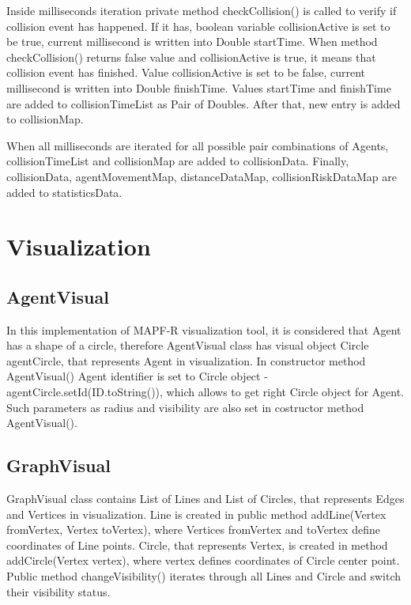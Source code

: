 \documentclass[thesis=B,english]{FITthesis}[2019/12/23]
\begin{document}
Inside milliseconds iteration private method checkCollision() is called to verify if collision event has happened. If it has, boolean variable collisionActive is set to be true, current millisecond is written into Double startTime. When method checkCollision() returns false value and collisionActive is true, it means that collision event has finished. Value collisionActive is set to be false, current millisecond is written into Double finishTime. Values startTime and finishTime are added to collisionTimeList as Pair of Doubles. After that, new entry is added to collisionMap. 

When all milliseconds are iterated for all possible pair combinations of Agents, 
collisionTimeList and collisionMap are added to collisionData. Finally,
collisionData, agentMovementMap, distanceDataMap, collisionRiskDataMap are added to statisticsData.

\section{Visualization}

\subsection{AgentVisual}

In this implementation of MAPF-R visualization tool, it is considered that Agent has a shape of a circle, therefore AgentVisual class has visual object Circle agentCircle, that represents Agent in visualization. In constructor method AgentVisual() Agent identifier is set to Circle object - agentCircle.setId(ID.toString()), which allows to get right Circle object for Agent. Such parameters as radius and visibility are also set in costructor method AgentVisual().

\subsection{GraphVisual}
GraphVisual class contains List of Lines and List of Circles, that represents Edges and Vertices in visualization. Line is created in public method addLine(Vertex fromVertex, Vertex toVertex), where Vertices fromVertex and toVertex define coordinates of Line points. Circle, that represents Vertex, is created in method addCircle(Vertex vertex), where vertex defines coordinates of Circle center point. Public method changeVisibility() iterates through all Lines and Circle and switch their visibility status.           
\end{document}
